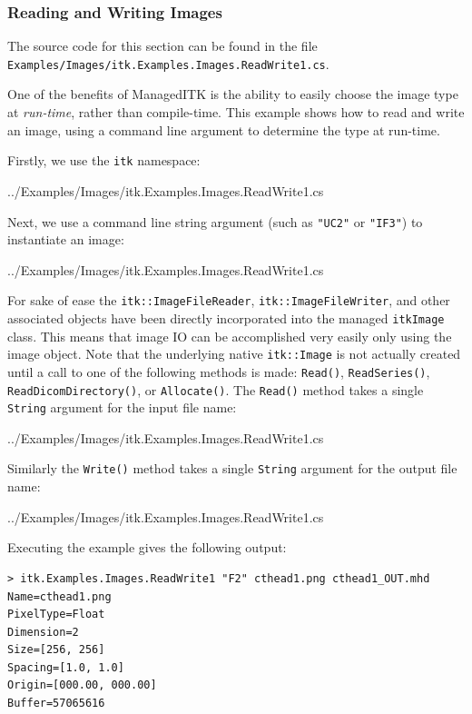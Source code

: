 \documentclass{InsightArticle}
\def\code#1{\texttt{#1}}
\begin{document}
\subsubsection{Reading and Writing Images}
The source code for this section can be found in the file\\
\code{Examples/Images/itk.Examples.Images.ReadWrite1.cs}.

One of the benefits of ManagedITK is the ability to easily
choose the image type at \emph{run-time}, rather than compile-time.
This example shows how to read and write an image, using a command line
argument to determine the type at run-time.

Firstly, we use the \code{itk} namespace:
\begin{center}
	
	{../Examples/Images/itk.Examples.Images.ReadWrite1.cs}
\end{center}

Next, we use a command line string argument (such as \code{"UC2"} or \code{"IF3"})
to instantiate an image:
\begin{center}
	
	{../Examples/Images/itk.Examples.Images.ReadWrite1.cs}
\end{center}

For sake of ease the \code{itk::ImageFileReader}, \code{itk::ImageFileWriter},
and other associated objects have been directly incorporated into
the managed \code{itkImage} class. This means that image IO can be accomplished
very easily only using the image object.
Note that the underlying native \code{itk::Image} is not actually created until
a call to one of the following methods is made: \code{Read()}, \code{ReadSeries()}, 
\code{ReadDicomDirectory()}, or \code{Allocate()}. 
The \code{Read()} method takes a single \code{String} argument for the input file name:
\begin{center}
	
	{../Examples/Images/itk.Examples.Images.ReadWrite1.cs}
\end{center}

Similarly the \code{Write()} method takes a single \code{String} argument for the output file name:
\begin{center}
	
	{../Examples/Images/itk.Examples.Images.ReadWrite1.cs}
\end{center}

Executing the example gives the following output:
\begin{lstlisting}
> itk.Examples.Images.ReadWrite1 "F2" cthead1.png cthead1_OUT.mhd
Name=cthead1.png
PixelType=Float
Dimension=2
Size=[256, 256]
Spacing=[1.0, 1.0]
Origin=[000.00, 000.00]
Buffer=57065616
\end{lstlisting}
\end{document}

